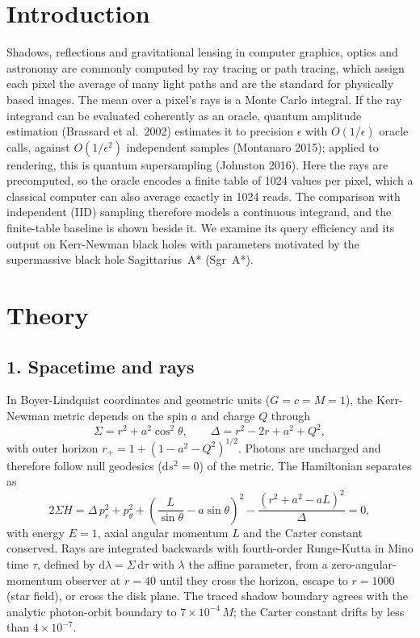 \documentclass[11pt,twocolumn]{article}
\begin{document}
\section*{Introduction}
Shadows, reflections and gravitational lensing in computer graphics, optics and astronomy are
commonly computed by ray tracing or path tracing, which assign each pixel the average of many
light paths and are the standard for physically based images. The mean over a pixel's rays is a
Monte Carlo integral. If the ray integrand can be evaluated coherently as an oracle, quantum amplitude
estimation (Brassard et al.\ 2002) estimates it to precision $\epsilon$ with $O(1/\epsilon)$ oracle
calls, against $O(1/\epsilon^2)$ independent samples (Montanaro 2015); applied to rendering, this is
quantum supersampling (Johnston 2016). Here the rays are precomputed, so the oracle encodes a finite
table of 1024 values per pixel, which a classical computer can also average exactly in 1024 reads.
The comparison with independent (IID) sampling therefore models a continuous integrand, and the
finite-table baseline is shown beside it. We examine its
query efficiency and its output on Kerr-Newman black holes with parameters motivated by the
supermassive black hole Sagittarius~A* (Sgr~A*).

\section*{Theory}

\subsection*{1. Spacetime and rays}
In Boyer-Lindquist coordinates and geometric units ($G = c = M = 1$), the Kerr-Newman metric
depends on the spin $a$ and charge $Q$ through
\begin{equation}
  \Sigma = r^2 + a^2\cos^2\theta, \qquad \Delta = r^2 - 2r + a^2 + Q^2,
\end{equation}
with outer horizon $r_+ = 1 + (1 - a^2 - Q^2)^{1/2}$. Photons are uncharged and therefore follow
null geodesics ($\mathrm{d}s^2 = 0$) of the metric. The Hamiltonian separates as
\begin{equation}
  2\Sigma H = \Delta\, p_r^2 + p_\theta^2 + \left(\frac{L}{\sin\theta} - a\sin\theta\right)^{2}
  - \frac{(r^2 + a^2 - aL)^2}{\Delta} = 0,
\end{equation}
with energy $E = 1$, axial angular momentum $L$ and the Carter constant conserved. Rays are
integrated backwards with fourth-order Runge-Kutta in Mino time $\tau$, defined by
$\mathrm{d}\lambda = \Sigma\,\mathrm{d}\tau$ with $\lambda$ the affine parameter, from a
zero-angular-momentum observer at $r = 40$ until they cross the horizon, escape to $r = 1000$ (star
field), or cross the disk plane. The traced shadow boundary agrees with the analytic photon-orbit
boundary to $7\times10^{-4}\,M$; the Carter constant drifts by less than $4\times10^{-7}$.
\end{document}
